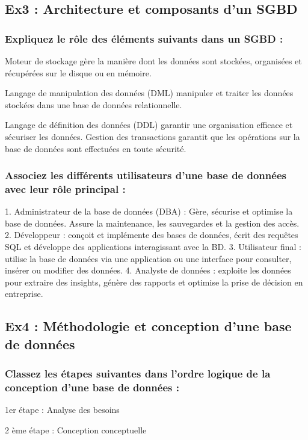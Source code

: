 \documentclass{article}
\begin{document}
\subsection{Ex3 : Architecture et composants d’un SGBD}
\subsubsection{Expliquez le rôle des éléments suivants dans un SGBD :}
Moteur de stockage gère la manière dont les données sont stockées, organisées et récupérées sur le 
disque ou en mémoire. 

Langage de manipulation des données (DML) manipuler et traiter les données stockées dans une 
base de données relationnelle.  

Langage de définition des données (DDL) garantir une organisation efficace et sécuriser les 
données. 
Gestion des transactions garantit que les opérations sur la base de données sont effectuées en toute 
sécurité.  

\subsubsection{Associez les différents utilisateurs d’une base de données avec leur rôle principal :}
1.
Administrateur de la base de données (DBA) : Gère, sécurise et optimise la base de données. 
Assure la maintenance, les sauvegardes et la gestion des accès. 
2. Développeur : conçoit et implémente des bases de données, écrit des requêtes SQL et 
développe des applications interagissant avec la BD. 
3.  Utilisateur final : utilise la base de données via une application ou une interface pour 
consulter, insérer ou modifier des données. 
4. Analyste de données : exploite les données pour extraire des insights, génère des rapports et 
optimise la prise de décision en entreprise. 

\subsection{Ex4 : Méthodologie et conception d’une base de données}
\subsubsection{Classez les étapes suivantes dans l’ordre logique de la conception d’une base de données :}
1er étape : Analyse des besoins         %

2 ème étape : Conception conceptuelle   %
\end{document}
